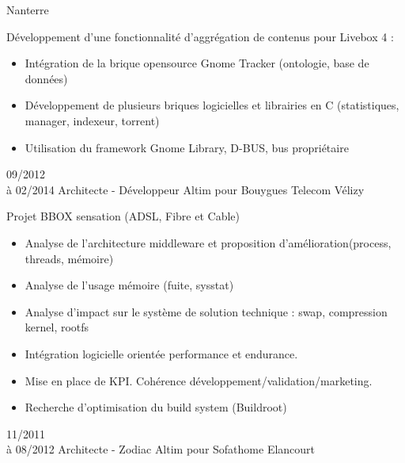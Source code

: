 \documentclass[10pt,a4paper]{moderncv}       %
\begin{document}
{Nanterre}                 %
{}                         %
{
Développement d’une fonctionnalité d’aggrégation de contenus pour Livebox 4 :
\begin{itemize}
  \item  Intégration de la brique opensource Gnome Tracker (ontologie, base de
données)
  \item Développement de plusieurs briques logicielles et librairies en C
 (statistiques, manager, indexeur, torrent)
  \item Utilisation du framework Gnome Library, D-BUS, bus propriétaire
\end{itemize}
\newline{}}
\cventry
{09/2012\\à 02/2014}          %
{Architecte - Développeur}    %
{Altim pour Bouygues Telecom} %
{Vélizy}                      %
{}                            %
{Projet BBOX sensation (ADSL, Fibre et Cable)
\begin{itemize}
  \item Analyse de l’architecture middleware et proposition d’amélioration(process, threads, mémoire)
  \item Analyse de l’usage mémoire (fuite, sysstat)
  \item Analyse d’impact sur le système de solution technique : swap, compression kernel, rootfs
  \item Intégration logicielle orientée performance et endurance.
  \item Mise en place de KPI. Cohérence développement/validation/marketing.
  \item Recherche d’optimisation du build system (Buildroot)
\end{itemize}
\newline{}}
\cventry
{11/2011\\à 08/2012}   %
{Architecte - Zodiac}  %
{Altim pour Sofathome} %
{Elancourt}            %
{}                     %
\end{document}
